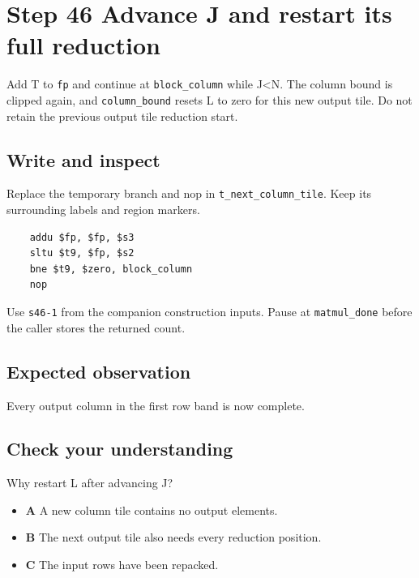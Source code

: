 \section{Step 46 Advance J and restart its full reduction}\label{matmul-s46}

Add T to \texttt{fp} and continue at \texttt{block\_column} while J<N. The column bound is clipped again, and \texttt{column\_bound} resets L to zero for this new output tile. Do not retain the previous output tile reduction start.

\subsection{Write and inspect}
Replace the temporary branch and nop in \texttt{t\_next\_column\_tile}. Keep its surrounding labels and region markers.

\begin{verbatim}
    addu $fp, $fp, $s3
    sltu $t9, $fp, $s2
    bne $t9, $zero, block_column
    nop
\end{verbatim}
Use \texttt{s46-1} from the companion construction inputs. Pause at \texttt{matmul\_done} before the caller stores the returned count.

\subsection{Expected observation}
Every output column in the first row band is now complete.

\subsection{Check your understanding}
Why restart L after advancing J?

\begin{itemize}
\item \textbf{A} A new column tile contains no output elements.
\item \textbf{B} The next output tile also needs every reduction position.
\item \textbf{C} The input rows have been repacked.
\end{itemize}
